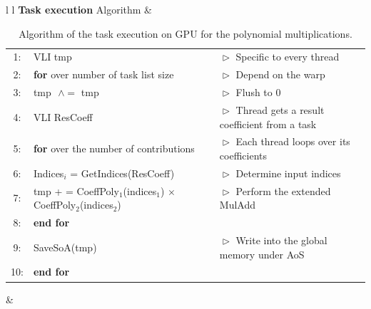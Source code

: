 \documentclass[oribibl]{llncs2e/llncs}
\begin{document}
 \begin{table}[t] 
	\begin{center}
	 	\begin{tabular}{l l}
                           \hline 
                           \textbf{Task execution}  Algorithm &  \\ \hline
                           \begin{tabular}{c l l} 
                               \tiny{1:} & VLI tmp   &  $\vartriangleright$ Specific to every thread  \\
                               \tiny{2:} &  \textbf{for} over number of task list size &$\vartriangleright$  Depend on the warp \\
                               \tiny{3:} &  tmp $\,\, \wedge=$ tmp     & $\vartriangleright$ Flush to 0 \\    
                               \tiny{4:} &   VLI ResCoeff &$\vartriangleright$  Thread gets a result coefficient from a task \\
                               \tiny{5:} &  \hspace{0.2 cm}  \textbf{for} over the number of contributions  & $\vartriangleright$ Each thread loops over its coefficients \\
                               \tiny{6:} &  \hspace{0.4 cm}   Indices$_i$ = GetIndices(ResCoeff) &$\vartriangleright$ Determine input indices \\
                               \tiny{7:} &  \hspace{0.4 cm}   tmp + = CoeffPoly$_1$(indices$_1$) $\times$ CoeffPoly$_2$(indices$_2$) &$\vartriangleright$ Perform the extended MulAdd  \\
                               \tiny{8:} &  \hspace{0.2 cm}   \textbf{end for} &\\
                               \tiny{9:} &  SaveSoA(tmp) & $\vartriangleright$ Write into the global memory under AoS \\                               
                               \tiny{10:} &  \textbf{end for} &\\                               
                          \end{tabular} &  \\ \hline
		 \end{tabular} 
		 \caption{Algorithm of the task execution on GPU for the polynomial multiplications. \label{ALGO}}
	\end{center}
\end{table} 
\end{document}
